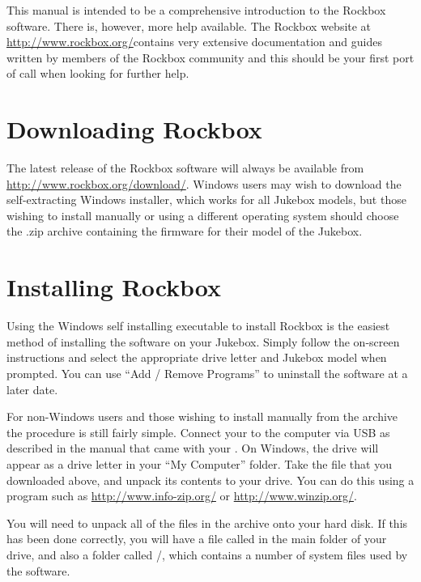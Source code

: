 This manual is intended to be a comprehensive introduction to the Rockbox
software.  There is, however, more help available.  The Rockbox website at
\url{http://www.rockbox.org/}contains very extensive documentation and guides
written by members of the Rockbox community and this should be your first port
of call when looking for further help.



\section{Downloading Rockbox}

The latest release of the Rockbox software will always be available from
\url{http://www.rockbox.org/download/}.
 Windows users may wish to download the self{}-extracting Windows
installer, which works for all Jukebox models, but those wishing to
install manually or using a different operating system should choose
the .zip archive containing the firmware for their model of the
Jukebox.

\section{Installing Rockbox}

Using the Windows self installing executable to install Rockbox is the easiest
method of installing the software on your Jukebox.  Simply follow the
on{}-screen instructions and select the appropriate drive letter and Jukebox
model when prompted.  You can use ``Add / Remove Programs'' to uninstall the
software at a later date.

For non{}-Windows users and those wishing to install manually from the archive
the procedure is still fairly simple.  Connect your \playername to the computer
via USB as described in the manual that came with your \playername. On Windows,
the \playername drive will appear as a drive letter in your ``My Computer''
folder. Take the file that you downloaded above, and unpack its contents to
your \playername drive. You can do this using a program such as
\url{http://www.info-zip.org/} or \url{http://www.winzip.org/}. 

You will need to unpack all of the files in the archive onto your hard
disk. If this has been done correctly, you will have a file called
in the main folder of your \playername drive, and also a folder called
/, which contains a number of system files used by the
software.

